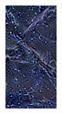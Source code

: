 \begin{figure}[]
\begin{subfigure}{0.6\textwidth}
\begin{subfigure}{0.48\textwidth}
\begin{subfigure}{0.32\textwidth}
                \includegraphics[width=\textwidth]{images/04-experiment02/human/marble/gatys_proj_crop_red.jpg}
                \caption*{}
            \end{subfigure}

\end{subfigure}
\end{subfigure}
\end{figure}

